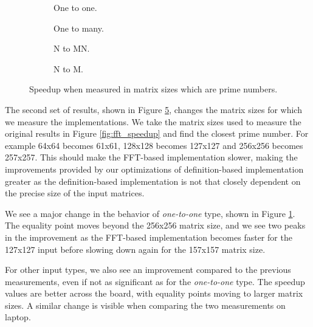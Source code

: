 \begin{figure}[ht]
	\centering	
	\begin{subfigure}{0.4\textwidth}
		\centering
		\def\svgwidth{\textwidth}
		
		\caption{One to one.}
		\label{fig:fft_speedup_antifft_one_to_one}
	\end{subfigure}
	\begin{subfigure}{0.4\textwidth}
		\centering
		\def\svgwidth{\textwidth}
		
		\caption{One to many.}
		\label{fig:fft_speedup_antifft_one_to_many}
	\end{subfigure}
	\begin{subfigure}{0.4\textwidth}
		\centering
		\def\svgwidth{\textwidth}
		
		\caption{N to MN.}
		\label{fig:fft_speedup_antifft_n_to_mn}
	\end{subfigure}
	\begin{subfigure}{0.4\textwidth}
		\centering
		\def\svgwidth{\textwidth}
		
		\caption{N to M.}
		\label{fig:fft_speedup_antifft_n_to_m}
	\end{subfigure}
	\caption{Speedup when measured in matrix sizes which are prime numbers.}
	\label{fig:fft_speedup_antifft}
\end{figure}

The second set of results, shown in Figure \ref{fig:fft_speedup_antifft}, changes the matrix sizes for which we measure the implementations. We take the matrix sizes used to measure the original results in Figure \ref{fig:fft_speedup} and find the closest prime number. For example 64x64 becomes 61x61, 128x128 becomes 127x127 and 256x256 becomes 257x257. This should make the FFT-based implementation slower, making the improvements provided by our optimizations of definition-based implementation greater as the definition-based implementation is not that closely dependent on the precise size of the input matrices.

We see a major change in the behavior of \textit{one-to-one} type, shown in Figure \ref{fig:fft_speedup_antifft_one_to_one}. The equality point moves beyond the 256x256 matrix size, and we see two peaks in the improvement as the FFT-based implementation becomes faster for the 127x127 input before slowing down again for the 157x157 matrix size. 

For other input types, we also see an improvement compared to the previous measurements, even if not as significant as for the \textit{one-to-one} type. The speedup values are better across the board, with equality points moving to larger matrix sizes. A similar change is visible when comparing the two measurements on laptop.


